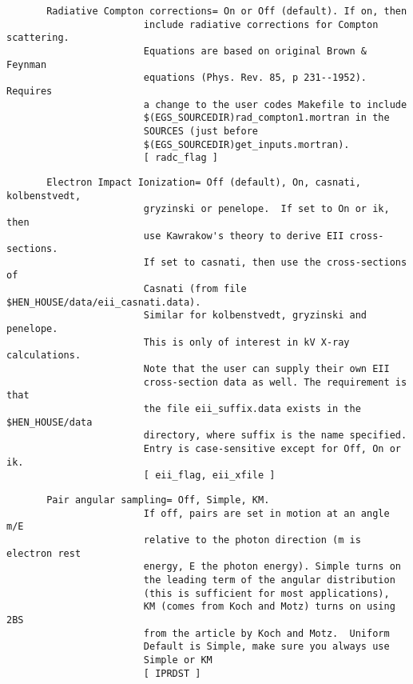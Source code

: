 \begin{verbatim}
       Radiative Compton corrections= On or Off (default). If on, then
                        include radiative corrections for Compton scattering.
                        Equations are based on original Brown & Feynman
                        equations (Phys. Rev. 85, p 231--1952).  Requires
                        a change to the user codes Makefile to include
                        $(EGS_SOURCEDIR)rad_compton1.mortran in the
                        SOURCES (just before
                        $(EGS_SOURCEDIR)get_inputs.mortran).
                        [ radc_flag ]
\end{verbatim}
\begin{verbatim}
       Electron Impact Ionization= Off (default), On, casnati, kolbenstvedt,
                        gryzinski or penelope.  If set to On or ik, then
                        use Kawrakow's theory to derive EII cross-sections.
                        If set to casnati, then use the cross-sections of
                        Casnati (from file $HEN_HOUSE/data/eii_casnati.data).
                        Similar for kolbenstvedt, gryzinski and penelope.
                        This is only of interest in kV X-ray calculations.
                        Note that the user can supply their own EII
                        cross-section data as well. The requirement is that
                        the file eii_suffix.data exists in the $HEN_HOUSE/data
                        directory, where suffix is the name specified.
                        Entry is case-sensitive except for Off, On or ik.
                        [ eii_flag, eii_xfile ]
\end{verbatim}
\begin{verbatim}
       Pair angular sampling= Off, Simple, KM.
                        If off, pairs are set in motion at an angle m/E
                        relative to the photon direction (m is electron rest
                        energy, E the photon energy). Simple turns on
                        the leading term of the angular distribution
                        (this is sufficient for most applications),
                        KM (comes from Koch and Motz) turns on using 2BS
                        from the article by Koch and Motz.  Uniform
                        Default is Simple, make sure you always use
                        Simple or KM
                        [ IPRDST ]
\end{verbatim}
